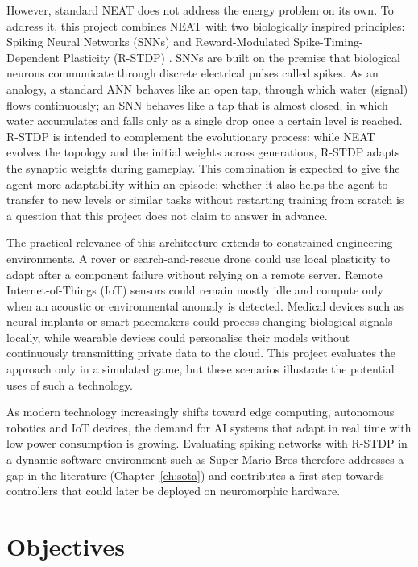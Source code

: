 However, standard NEAT does not address the energy problem on its own. To address it, this project combines NEAT with two biologically inspired principles: Spiking Neural Networks (SNNs) \cite{gerstner2014} and Reward-Modulated Spike-Timing-Dependent Plasticity (R-STDP) \cite{mozafari2018,izhikevich2007}. SNNs are built on the premise that biological neurons communicate through discrete electrical pulses called spikes. As an analogy, a standard ANN behaves like an open tap, through which water (signal) flows continuously; an SNN behaves like a tap that is almost closed, in which water accumulates and falls only as a single drop once a certain level is reached. R-STDP is intended to complement the evolutionary process: while NEAT evolves the topology and the initial weights across generations, R-STDP adapts the synaptic weights during gameplay. This combination is expected to give the agent more adaptability within an episode; whether it also helps the agent to transfer to new levels or similar tasks without restarting training from scratch is a question that this project does not claim to answer in advance.

The practical relevance of this architecture extends to constrained engineering environments. A rover or search-and-rescue drone could use local plasticity to adapt after a component failure without relying on a remote server. Remote Internet-of-Things (IoT) sensors could remain mostly idle and compute only when an acoustic or environmental anomaly is detected. Medical devices such as neural implants or smart pacemakers could process changing biological signals locally, while wearable devices could personalise their models without continuously transmitting private data to the cloud. This project evaluates the approach only in a simulated game, but these scenarios illustrate the potential uses of such a technology.

As modern technology increasingly shifts toward edge computing, autonomous robotics and IoT devices, the demand for AI systems that adapt in real time with low power consumption is growing. Evaluating spiking networks with R-STDP in a dynamic software environment such as Super Mario Bros therefore addresses a gap in the literature (Chapter~\ref{ch:sota}) and contributes a first step towards controllers that could later be deployed on neuromorphic hardware.

\section{Objectives}

